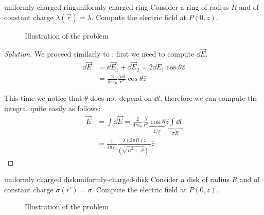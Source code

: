 \documentclass[12pt]{extarticle}
\begin{document}
\begin{example}{uniformly charged ring}{uniformly-charged-ring}
    Consider a ring of radius $R$ and of constant charge $\lambda(\vec r) = \lambda$.
    Compute the electric field at $P(0,z)$.

    \begin{figure}[H]
        \centering
        
        \caption{Illustration of the problem}
    \end{figure}
\end{example}

\begin{proof}[Solution]
    We proceed similarly to : first we need to compute $\dd{\vec E}$.
    \begin{align}
        \dd{\vec E} & = \dd{\vec E_1} + \dd{\vec E_2} = 2 \dd{E_1} \cos \theta \hat z               \\
                    & = \frac{2}{4 \pi \varepsilon_0} \frac{\lambda \dd{l}}{r^2} \cos \theta \hat z
    \end{align}

    This time we notice that $\theta$ does not depend on $\dd{l}$, therefore we can compute the integral quite easily as follows:
    \begin{align}
        \vec E & = \int \dd{\vec E} = \frac{2}{4 \pi \varepsilon_0} \frac{\lambda}{r^2} \underbrace{\cos \theta}_{z/r} \hat z \underbrace{\int \dd{l}}_{\pi R} \\
               & = \frac{1}{4 \pi \varepsilon_0} \frac{\lambda (2\pi R) z}{\left(\sqrt{R^2 + z^2}\right)^3} \hat z
    \end{align}
\end{proof}

\begin{example}{uniformly charged disk}{uniformly-charged-disk}
    Consider a disk of radius $R$ and of constant charge $\sigma(r') = \sigma$.
    Compute the electric field at $P(0,z)$.

    \begin{figure}[H]
        \centering
        
        \caption{Illustration of the problem}
    \end{figure}
\end{example}
\end{document}
